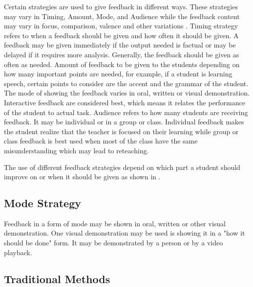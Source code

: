 Certain strategies are used to give feedback in different ways. These strategies may vary in Timing, Amount, Mode, and Audience while the feedback content may vary in focus, comparison, valence and other variations \cite{brookhart:2008:gef}. Timing strategy refers to when a feedback should be given and how often it should be given. A feedback may be given immediately if the output needed is factual or may be delayed if it requires more analysis. Generally, the feedback should be given as often as needed. Amount of feedback to be given to the students depending on how many important points are needed, for example, if a student is learning speech, certain points to consider are the accent and the grammar of the student. The mode of showing the feedback varies in oral, written or visual demonstration. Interactive feedback are considered best, which means it relates the performance of the student to actual task. Audience refers to how many students are receiving feedback. It may be individual or in a group or class. Individual feedback makes the student realize that the teacher is focused on their learning while group or class feedback is best used when most of the class have the same misunderstanding which may lead to reteaching.

The use of different feedback strategies depend on which part a student should improve on or when it should be given as shown in . 

\subsection{Mode Strategy}
Feedback in a form of mode may be shown in oral, written or other visual demonstration. One visual demonstration may be used is showing it in a "how it should be done" form. It may be demonstrated by a person or by a video playback.

\subsection{Traditional Methods}

\begin{comment}
Various ways to teach speech to the deaf were invented and developed since it was pioneered in the 16th century \cite{markides:1983:sohic}. It started with Pedro Ponce de Leon, a Benedictan monk in Spain, who first started teaching speech to the Deaf when he met two deaf boys and was put under the care of the monastery \cite{markides:1983:sohic}.
\end{comment}

